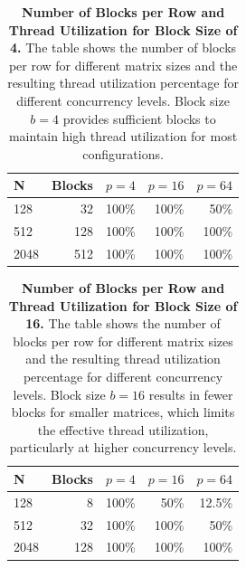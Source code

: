 \begin{table}[htbp]
    \centering
    \begin{tabular}{lrrrr}
    \toprule
    N & Blocks & \(p=4\) & \(p=16\) & \(p=64\) \\
    \midrule
    128  & 32 & 100\% & 100\% & 50\% \\
    512  & 128 & 100\% & 100\% & 100\% \\
    2048 & 512 & 100\% & 100\% & 100\% \\
    \bottomrule
    \end{tabular}
    \caption{\textbf{Number of Blocks per Row and Thread Utilization for Block Size of 4.} The table shows the number of blocks per row for different matrix sizes and the resulting thread utilization percentage for different concurrency levels. Block size \(b = 4\) provides sufficient blocks to maintain high thread utilization for most configurations.}
    \label{tab:b4-threads-utilization}
\end{table}

\begin{table}[htbp]
    \centering
    \begin{tabular}{lrrrr}
    \toprule
    N & Blocks & \(p=4\) & \(p=16\) & \(p=64\) \\
    \midrule
    128  & 8 & 100\% & 50\% & 12.5\% \\
    512  & 32 & 100\% & 100\% & 50\% \\
    2048 & 128 & 100\% & 100\% & 100\% \\
    \bottomrule
    \end{tabular}
    \caption{\textbf{Number of Blocks per Row and Thread Utilization for Block Size of 16.} The table shows the number of blocks per row for different matrix sizes and the resulting thread utilization percentage for different concurrency levels. Block size \(b = 16\) results in fewer blocks for smaller matrices, which limits the effective thread utilization, particularly at higher concurrency levels.}
    \label{tab:b16-threads-utilization}
\end{table}
